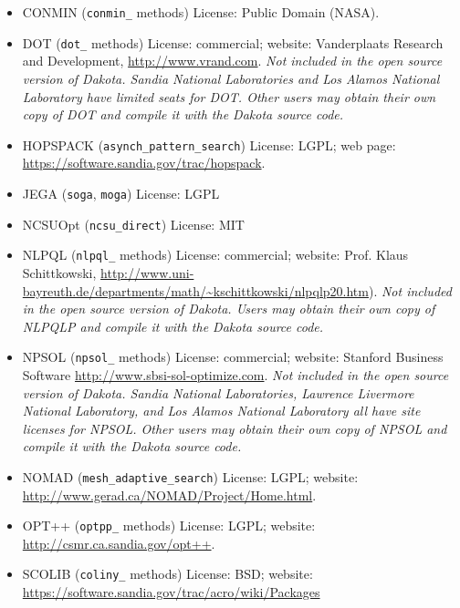 \begin{itemize}

\item CONMIN (\texttt{conmin\_} methods) License: Public Domain
  (NASA).

\item DOT (\texttt{dot\_} methods) License: commercial; website:
  Vanderplaats Research and Development,
  \url{http://www.vrand.com}. {\em Not included in the open source
    version of Dakota.  Sandia National Laboratories and Los Alamos
    National Laboratory have limited seats for DOT. Other users may
    obtain their own copy of DOT and compile it with the Dakota source
    code.}

\item HOPSPACK (\texttt{asynch\_pattern\_search}) License: LGPL; web
  page: \url{https://software.sandia.gov/trac/hopspack}.

\item JEGA (\texttt{soga}, \texttt{moga}) License: LGPL

\item NCSUOpt (\texttt{ncsu\_direct}) License: MIT

\item NLPQL (\texttt{nlpql\_} methods) License: commercial; website:
  Prof. Klaus Schittkowski,
  \url{http://www.uni-bayreuth.de/departments/math/~kschittkowski/nlpqlp20.htm}). \emph{Not included in the open source version of Dakota.  Users may
    obtain their own copy of NLPQLP and compile it with the Dakota
    source code.}

\item NPSOL (\texttt{npsol\_} methods) License: commercial; website:
  Stanford Business Software
  \url{http://www.sbsi-sol-optimize.com}. {\em Not included in the
    open source version of Dakota.  Sandia National Laboratories,
    Lawrence Livermore National Laboratory, and Los Alamos National
    Laboratory all have site licenses for NPSOL. Other users may
    obtain their own copy of NPSOL and compile it with the Dakota
    source code.}

\item NOMAD (\texttt{mesh\_adaptive\_search}) License: LGPL; website:
  \url{http://www.gerad.ca/NOMAD/Project/Home.html}.

\item OPT++ (\texttt{optpp\_} methods) License: LGPL; website:
  \url{http://csmr.ca.sandia.gov/opt++}.

\item SCOLIB (\texttt{coliny\_} methods) License: BSD; website:
  \url{https://software.sandia.gov/trac/acro/wiki/Packages}

\end{itemize}

